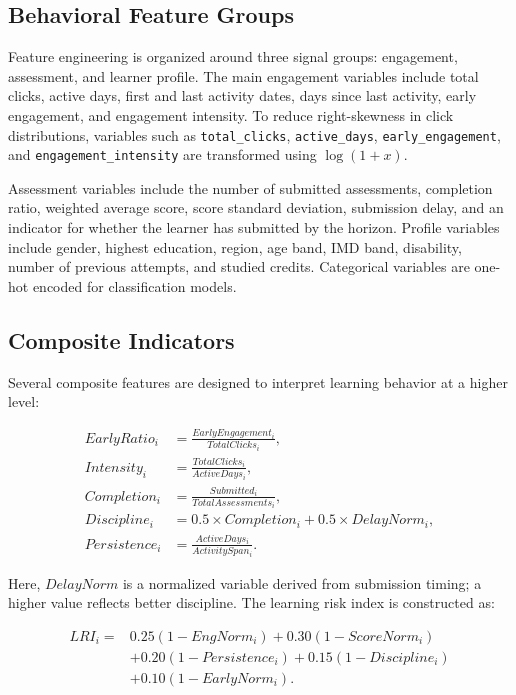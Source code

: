 \documentclass[conference]{IEEEtran}
\begin{document}
\subsection{Behavioral Feature Groups}

Feature engineering is organized around three signal groups: engagement, assessment, and learner profile. The main engagement variables include total clicks, active days, first and last activity dates, days since last activity, early engagement, and engagement intensity. To reduce right-skewness in click distributions, variables such as \texttt{total\_clicks}, \texttt{active\_days}, \texttt{early\_engagement}, and \texttt{engagement\_intensity} are transformed using \(\log(1+x)\).

Assessment variables include the number of submitted assessments, completion ratio, weighted average score, score standard deviation, submission delay, and an indicator for whether the learner has submitted by the horizon. Profile variables include gender, highest education, region, age band, IMD band, disability, number of previous attempts, and studied credits. Categorical variables are one-hot encoded for classification models.

\subsection{Composite Indicators}

Several composite features are designed to interpret learning behavior at a higher level:

\begin{align}
EarlyRatio_i &= \frac{EarlyEngagement_i}{TotalClicks_i}, \\
Intensity_i &= \frac{TotalClicks_i}{ActiveDays_i}, \\
Completion_i &= \frac{Submitted_i}{TotalAssessments_i}, \\
Discipline_i &= 0.5 \times Completion_i + 0.5 \times DelayNorm_i, \\
Persistence_i &= \frac{ActiveDays_i}{ActivitySpan_i}.
\end{align}

Here, \(DelayNorm\) is a normalized variable derived from submission timing; a higher value reflects better discipline. The learning risk index is constructed as:

\begin{equation}
\begin{split}
LRI_i = &0.25(1-EngNorm_i) + 0.30(1-ScoreNorm_i) \\
&+ 0.20(1-Persistence_i) + 0.15(1-Discipline_i) \\
&+ 0.10(1-EarlyNorm_i).
\end{split}
\label{eq:lri}
\end{equation}
\end{document}
